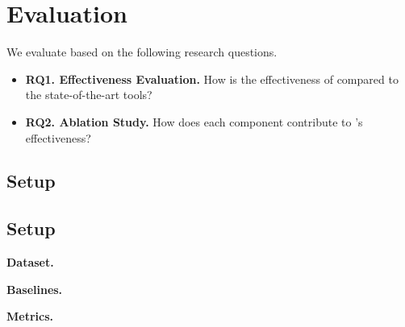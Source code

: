 
\section{Evaluation}

We evaluate \tool based on the following research questions.



\begin{itemize}[leftmargin=*]
  \item \textbf{RQ1. Effectiveness Evaluation.} How is the effectiveness of \tool compared to the state-of-the-art tools?
  \item \textbf{RQ2. Ablation Study.} How does each component contribute to \tool's effectiveness?
\end{itemize}
\subsection{Setup}



\subsection{Setup}

\textbf{Dataset.}

\textbf{Baselines.} 

\textbf{Metrics.}

